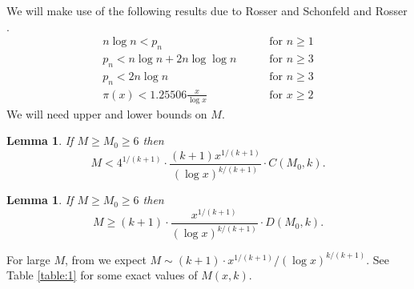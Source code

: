 \documentclass[11pt]{amsart}
\newcommand{\p}[1]{\left(#1\right)}
\newtheorem{lem}[thm]{Lemma}
\numberwithin{equation}{section}
\numberwithin{algorithm}{section}
\begin{document}

We will make use of the following results due to Rosser and Schonfeld \cite{RS62} and Rosser \cite{Rosser1939}.
\begin{eqnarray}
  n\log n  <  p_n &&\quad\mbox{ for } n\ge 1
  \label{eq:pnlow}\\
  p_n < n\log n + 2n\log\log n &&\quad\mbox{ for } n\ge 3
  \label{eq:pnhigh}\\
  p_n < 2n\log n && \quad\mbox{ for }n\ge3
  \label{eq:pnhighlame}\\
  \pi(x)<1.25506\frac{x}{\log x}
  && \quad\mbox{ for }x\ge 2
  \label{eq:pixhigh}
\end{eqnarray}
We will need upper and lower bounds on $M$.


\begin{lem}\label{lem:mhigh}
If $M\ge M_0 \ge 6$ then
$$
M < 4^{1/(k+1)} \cdot \frac{(k+1) x^{1/(k+1)}}{(\log x)^{k/(k+1)}}
\cdot C(M_0,k)
.
$$
\end{lem}

\begin{lem}\label{lem:mlow}
If $M\ge M_0\ge 6$ then
$$
M \ge (k+1)\cdot\frac{ x^{1/(k+1)}}{(\log x)^{k/(k+1)}}
\cdot D(M_0,k).
$$
%
\end{lem} 
For large $M$, from \cite{OSS2024} we expect 
$M\sim (k+1) \cdot x^{1/(k+1)}/(\log x)^{k/(k+1)}$.
See Table \ref{table:1} for some exact values of $M(x,k)$.
\end{document}
